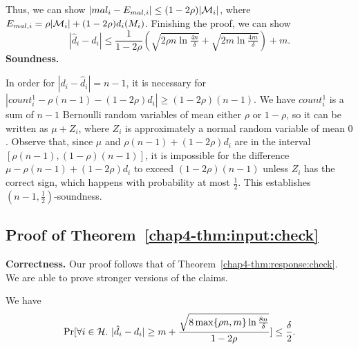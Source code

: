Thus, we can show $|mal_i - E_{mal,i}| \leq (1-2\rho) |\mathcal{M}_i|$, where $E_{mal,i} = \rho |\mathcal{M}_i| + (1-2\rho)d_i(M_i)$.
Finishing the proof, we can show 
\[
|\hat{d}_i - d_i | \leq \frac{1}{1-2\rho} (\sqrt{2\rho n \ln \tfrac{4n}{\delta}} + \sqrt{2m \ln \tfrac{4m}{\delta}}) + m.
\]
\noindent \textbf{Soundness.}

In order for $|d_i - \hat{d}_i| = n-1$, it is necessary for $|count_i^{1} - \rho(n-1) - (1-2\rho)d_i| \geq (1-2\rho)(n-1)$. We have $count_i^1$ is a sum of $n-1$ Bernoulli random variables of mean either $\rho$ or $1-\rho$, so it can be written as $\mu + Z_i$, where $Z_i$ is approximately a normal random variable of mean $0$. Observe that, since $\mu$ and $\rho(n-1) + (1-2\rho)d_i$ are in the interval $[\rho (n-1), (1-\rho)(n-1)]$, it is impossible for the difference $\mu - \rho(n-1) + (1-2\rho)d_i$ to exceed $(1-2\rho)(n-1)$ unless $Z_i$ has the correct sign, which happens with probability at most $\frac{1}{2}$. This establishes $(n-1, \frac{1}{2})$-soundness.
\subsection{Proof of Theorem~\ref{chap4-thm:input:check}}\label{chap4-app:b3a2}

\textbf{Correctness.}
Our proof follows that of Theorem~\ref{chap4-thm:response:check}. We are able to prove stronger versions of the claims.

\begin{claim}\label{chap4-claim:honest-input-concentration-1}
We have
\[
    \Pr[\forall i \in \mathcal{H}.~|\hat{d}_i - d_i| \geq m+\frac{\sqrt{8\max\{\rho n, m\} \ln \frac{8n}{\delta}}}{1-2\rho}] \leq \frac{\delta}{2}.
\]
\end{claim}

